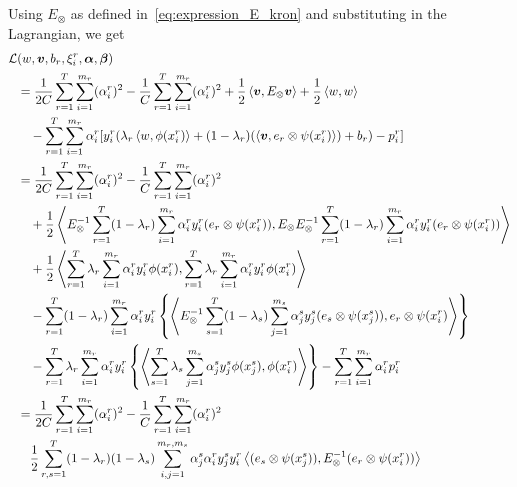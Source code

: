 Using $E_\otimes$ as defined in~\eqref{eq:expression_E_kron} and substituting in the Lagrangian, we get
\begin{equation}\nonumber
    \begin{aligned}
            \mathcal{L}&({w}, \fv{v}, b_r, \xi_i^r, {\fv{\alpha}}, \fv{\beta}) \\
            &= \frac{1}{2C} \sum_{r=1}^\ntasks \sum_{i=1}^{\npertask_r} (\alpha_i^r)^2 - \frac{1}{C} \sum_{r=1}^\ntasks \sum_{i=1}^{\npertask_r} (\alpha_i^r)^2 + \frac{1}{2} \dotp{\fv{v}}{E_\otimes\fv{v}} + \frac{1}{2} \dotp{w}{w}
            \\ &\quad  - \sum_{r=1}^T \sum_{i=1}^{\npertask_r}{ \alpha_i^r [y_{i}^r (\lambda_r \dotp{w}{\phi(x_i^r)} + (1 - \lambda_r) (\dotp{\fv{v}}{e_r \otimes \psi({x}_i^r)}) + b_r) - p_{i}^r]   } \\
            &= \frac{1}{2C} \sum_{r=1}^\ntasks \sum_{i=1}^{\npertask_r} (\alpha_i^r)^2 - \frac{1}{C} \sum_{r=1}^\ntasks \sum_{i=1}^{\npertask_r} (\alpha_i^r)^2 \\
            &\quad + \frac{1}{2} \dotp{E_\otimes^{-1} \sum_{r=1}^\ntasks (1 - \lambda_r) \sum_{i=1}^{\npertask_r}{\alpha_i^r y_i^r (e_r \otimes \psi({x}_i^r))}}{E_\otimes E_\otimes^{-1} \sum_{r=1}^\ntasks (1 - \lambda_r) \sum_{i=1}^{\npertask_r}{\alpha_i^r y_i^r (e_r \otimes \psi({x}_i^r))}} \\ 
            &\quad  +\frac{1}{2} \dotp{\sum_{r=1}^\ntasks \lambda_r \sum_{i=1}^{\npertask_r}{\alpha_i^r y_i^r \phi(x_i^r)}}{\sum_{r=1}^\ntasks \lambda_r \sum_{i=1}^{\npertask_r}{\alpha_i^r y_i^r \phi(x_i^r)}} \\
            &\quad - \sum_{r=1}^T (1 - \lambda_r) \sum_{i=1}^{\npertask_r}{ \alpha_i^r y_{i}^r \left\lbrace  \dotp{E_\otimes^{-1} \sum_{s=1}^\ntasks (1 - \lambda_s) \sum_{j=1}^{\npertask_s}{\alpha_j^s y_j^s (e_s \otimes \psi({x}_j^s))}}{e_r \otimes \psi(x_i^r)} \right\rbrace   } \\
            &\quad - \sum_{r=1}^T \lambda_r \sum_{i=1}^{\npertask_r}{ \alpha_i^r y_{i}^r \left\lbrace  \dotp{\sum_{s=1}^\ntasks \lambda_s \sum_{j=1}^{\npertask_s}{\alpha_j^s y_j^s \phi(x_j^s)}}{\phi(x_i^r)} \right\rbrace   } - \sum_{r=1}^\ntasks \sum_{i=1}^{\npertask_r} \alpha_i^r p_i^r \\
            &= \frac{1}{2C} \sum_{r=1}^\ntasks \sum_{i=1}^{\npertask_r} (\alpha_i^r)^2 - \frac{1}{C} \sum_{r=1}^\ntasks \sum_{i=1}^{\npertask_r} (\alpha_i^r)^2 \\
            &\quad \frac{1}{2} \sum_{r, s=1}^\ntasks (1-\lambda_r)(1-\lambda_s) \sum_{i, j=1}^{\npertask_r, \npertask_s} \alpha_j^s \alpha_i^r y_j^s y_i^r \dotp{(e_s \otimes \psi(x_j^s))}{E_\otimes^{-1} (e_r \otimes \psi(x_i^r))} \\ 

\end{aligned}
\end{equation}
